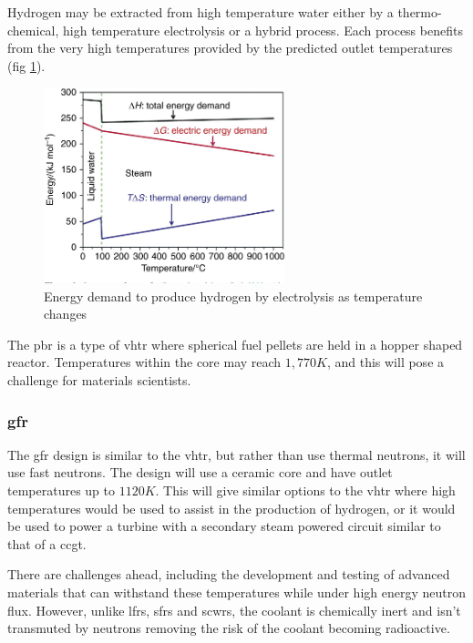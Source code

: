 Hydrogen may be extracted from high temperature water either by a thermo-chemical, high temperature electrolysis or a hybrid process\cite{hydrogenhtr}.  Each process benefits from the very high temperatures provided by the predicted outlet temperatures (fig \ref{fig:energyhydrogenproduction}).

\begin{figure}[tbp]
  \begin{center}
    \includegraphics[width=7.0cm]{chapters/introduction/images/hydrogen-from-water.png}
    \caption{Energy demand to produce hydrogen by electrolysis as temperature changes}
    \label{fig:energyhydrogenproduction}
  \end{center}
\end{figure}

The \acrfull{pbr} is a type of \acrshort{vhtr} where spherical fuel pellets are held in a hopper shaped reactor.  Temperatures within the core may reach $1,770K$, and this will pose a challenge for materials scientists.

\FloatBarrier
\subsubsection{\acrshort{gfr}}

The \acrfull{gfr} design is similar to the \acrshort{vhtr}, but rather than use thermal neutrons, it will use fast neutrons.  The design will use a ceramic core and have outlet temperatures up to $1120K$.  This will give similar options to the \acrshort{vhtr} where high temperatures would be used to assist in the production of hydrogen, or it would be used to power a turbine with a secondary steam powered circuit similar to that of a \acrshort{ccgt}.

There are challenges ahead, including the development and testing of advanced materials that can withstand these temperatures while under high energy neutron flux.  However, unlike \acrshort{lfr}s, \acrshort{sfr}s and \acrshort{scwr}s, the coolant is chemically inert and isn't transmuted by neutrons removing the risk of the coolant becoming radioactive.


